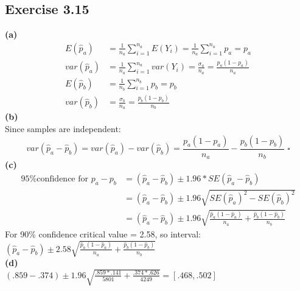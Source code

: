 \documentclass[fleqn]{article}
\begin{document}
\begin{adjustwidth}{-2cm}{-2cm}
\subsection{Exercise 3.15}
\textbf{(a)}
\begin{align*}
E\left(\hat{p}_{a}\right) &= \frac{1}{n_{a}}\sum_{i=1}^{n_{a}}E\left(Y_{i}\right) = \frac{1}{n_{a}}\sum_{i=1}^{n_{a}}p_{a} = p_{a}\\
var\left(\hat{p}_{a}\right) &= \frac{1}{n_{a}}\sum_{i=1}^{n_{a}}var\left(Y_{i}\right) = \frac{\sigma_{a}}{n_{a}} = \frac{p_{a}\left(1-p_{a}\right)}{n_{a}}\\
E\left(\hat{p}_{b}\right) &= \frac{1}{n_{b}}\sum_{i=1}^{n_{b}}p_{b} = p_{b}\\
var\left(\hat{p}_{b}\right) &= \frac{\sigma_{b}}{n_{a}} = \frac{p_{b}\left(1-p_{b}\right)}{n_{b}}
\end{align*}
\textbf{(b)}\\
Since samples are independent:
\begin{equation*}
var\left(\hat{p}_{a} - \hat{p}_{b}\right) = var\left(\hat{p}_{a}\right) - var\left(\hat{p}_{b}\right) = \frac{p_{a}\left(1-p_{a}\right)}{n_{a}} - \frac{p_{b}\left(1-p_{b}\right)}{n_{b}} \; \square
\end{equation*}
\textbf{(c)}
\begin{align*}
\text{95\% confidence for $p_{a}-p_{b}$} &= \left(\hat{p}_{a}-\hat{p}_{b}\right) \pm 1.96*SE\left(\hat{p}_{a}-\hat{p}_{b}\right)\\
&= \left(\hat{p}_{a}-\hat{p}_{b}\right) \pm 1.96\sqrt{SE\left(\hat{p}_{a}\right)^{2} - SE\left(\hat{p}_{b}\right)^{2}}\\
&= \left(\hat{p}_{a}-\hat{p}_{b}\right) \pm 1.96\sqrt{\frac{\hat{p}_{a}\left(1-\hat{p}_{a}\right)}{n_{a}} + \frac{\hat{p}_{b}\left(1-\hat{p}_{b}\right)}{n_{b}}}
\end{align*}
For 90\% confidence critical value = 2.58, so interval:\\
$\left(\hat{p}_{a}-\hat{p}_{b}\right) \pm 2.58\sqrt{\frac{\hat{p}_{a}\left(1-\hat{p}_{a}\right)}{n_{a}} + \frac{\hat{p}_{b}\left(1-\hat{p}_{b}\right)}{n_{b}}}$\\
\textbf{(d)}\\
$\left(.859-.374\right) \pm 1.96\sqrt{\frac{.859*.141}{5801} + \frac{.374*.626}{4249}} = [.468, .502]$

\end{adjustwidth}
\end{document}
